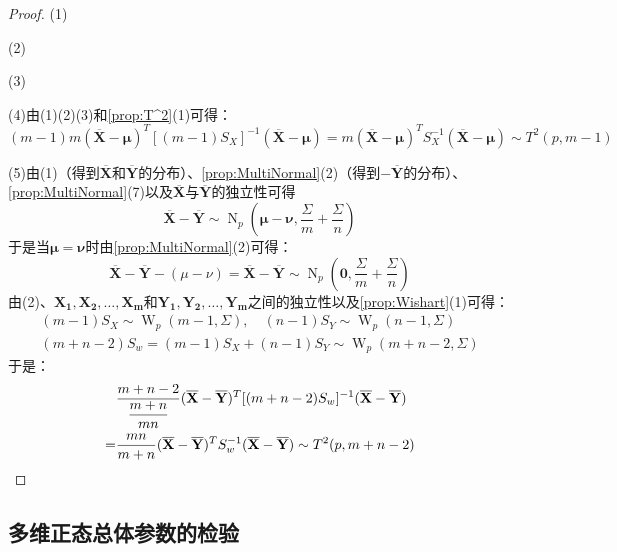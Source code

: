 \begin{proof}
	(1)\par
	(2)\par
	(3)\par
	(4)由(1)(2)(3)和\cref{prop:T^2}(1)可得：
	\begin{equation*}
		(m-1)m(\overline{\mathbf{X}}-\boldsymbol{\mu})^T[(m-1)S_X]^{-1}(\overline{\mathbf{X}}-\boldsymbol{\mu})=m(\overline{\mathbf{X}}-\boldsymbol{\mu})^TS_X^{-1}(\overline{\mathbf{X}}-\boldsymbol{\mu})\sim T^2(p,m-1)
	\end{equation*}\par
	(5)由(1)（得到$\overline{\mathbf{X}}$和$\overline{\mathbf{Y}}$的分布）、\cref{prop:MultiNormal}(2)（得到$-\overline{\mathbf{Y}}$的分布）、\cref{prop:MultiNormal}(7)以及$\overline{\mathbf{X}}$与$\overline{\mathbf{Y}}$的独立性可得
	\begin{equation*}
		\overline{\mathbf{X}}-\overline{\mathbf{Y}}\sim \operatorname{N}_p\left(\boldsymbol{\mu}-\boldsymbol{\nu},\frac{\Sigma}{m}+\frac{\Sigma}{n}\right)
	\end{equation*}
	于是当$\boldsymbol{\mu}=\boldsymbol{\nu}$时由\cref{prop:MultiNormal}(2)可得：
	\begin{equation*}
		\overline{\mathbf{X}}-\overline{\mathbf{Y}}-(\mu-\nu)=\overline{\mathbf{X}}-\overline{\mathbf{Y}}\sim \operatorname{N}_p\left(\mathbf{0},\frac{\Sigma}{m}+\frac{\Sigma}{n}\right)
	\end{equation*}
	由(2)、$\mathbf{X_1},\mathbf{X_2},\dots,\mathbf{X_m}$和$\mathbf{Y_1},\mathbf{Y_2},\dots,\mathbf{Y_m}$之间的独立性以及\cref{prop:Wishart}(1)可得：
	\begin{gather*}
		(m-1)S_X\sim\operatorname{W}_p(m-1,\Sigma),\quad(n-1)S_Y\sim\operatorname{W}_p(n-1,\Sigma) \\
		(m+n-2)S_w=(m-1)S_X+(n-1)S_Y\sim\operatorname{W}_p(m+n-2,\Sigma)
	\end{gather*}
	于是：
	\begin{align*}
		&\frac{m+n-2}{\dfrac{m+n}{mn}}(\overline{\mathbf{X}}-\overline{\mathbf{Y}})^T[(m+n-2)S_{w}]^{-1}(\overline{\mathbf{X}}-\overline{\mathbf{Y}}) \\
		=&\frac{mn}{m+n}(\overline{\mathbf{X}}-\overline{\mathbf{Y}})^TS_{w}^{-1}(\overline{\mathbf{X}}-\overline{\mathbf{Y}})\sim T^2(p,m+n-2)\qedhere
	\end{align*}
\end{proof}

\subsection{多维正态总体参数的检验}
